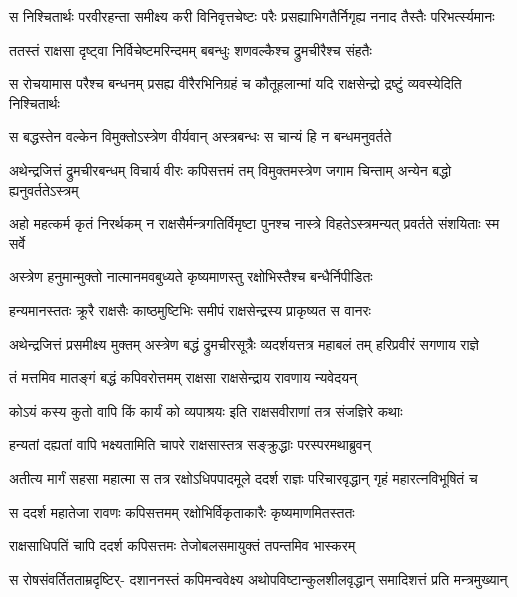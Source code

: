 \fourlineindentedshloka
{स निश्चितार्थः परवीरहन्ता}
{समीक्ष्य करी विनिवृत्तचेष्टः}
{परैः प्रसह्याभिगतैर्निगृह्य}
{ननाद तैस्तैः परिभर्त्स्यमानः} %

\twolineshloka
{ततस्तं राक्षसा दृष्ट्वा निर्विचेष्टमरिन्दमम्}
{बबन्धुः शणवल्कैश्च द्रुमचीरैश्च संहतैः} %

\fourlineindentedshloka
{स रोचयामास परैश्च बन्धनम्}
{प्रसह्य वीरैरभिनिग्रहं च}
{कौतूहलान्मां यदि राक्षसेन्द्रो}
{द्रष्टुं व्यवस्येदिति निश्चितार्थः} %

\twolineshloka
{स बद्धस्तेन वल्केन विमुक्तोऽस्त्रेण वीर्यवान्}
{अस्त्रबन्धः स चान्यं हि न बन्धमनुवर्तते} %

\fourlineindentedshloka
{अथेन्द्रजित्तं द्रुमचीरबन्धम्}
{विचार्य वीरः कपिसत्तमं तम्}
{विमुक्तमस्त्रेण जगाम चिन्ताम्}
{अन्येन बद्धो ह्यनुवर्ततेऽस्त्रम्} %

\fourlineindentedshloka
{अहो महत्कर्म कृतं निरर्थकम्}
{न राक्षसैर्मन्त्रगतिर्विमृष्टा}
{पुनश्च नास्त्रे विहतेऽस्त्रमन्यत्}
{प्रवर्तते संशयिताः स्म सर्वे} %

\twolineshloka
{अस्त्रेण हनुमान्मुक्तो नात्मानमवबुध्यते}
{कृष्यमाणस्तु रक्षोभिस्तैश्च बन्धैर्निपीडितः} %

\twolineshloka
{हन्यमानस्ततः क्रूरै राक्षसैः काष्ठमुष्टिभिः}
{समीपं राक्षसेन्द्रस्य प्राकृष्यत स वानरः} %

\fourlineindentedshloka
{अथेन्द्रजित्तं प्रसमीक्ष्य मुक्तम्}
{अस्त्रेण बद्धं द्रुमचीरसूत्रैः}
{व्यदर्शयत्तत्र महाबलं तम्}
{हरिप्रवीरं सगणाय राज्ञे} %

\twolineshloka
{तं मत्तमिव मातङ्गं बद्धं कपिवरोत्तमम्}
{राक्षसा राक्षसेन्द्राय रावणाय न्यवेदयन्} %

\twolineshloka
{कोऽयं कस्य कुतो वापि किं कार्यं को व्यपाश्रयः}
{इति राक्षसवीराणां तत्र संजज्ञिरे कथाः} %

\twolineshloka
{हन्यतां दह्यतां वापि भक्ष्यतामिति चापरे}
{राक्षसास्तत्र सङ्क्रुद्धाः परस्परमथाब्रुवन्} %

\fourlineindentedshloka
{अतीत्य मार्गं सहसा महात्मा}
{स तत्र रक्षोऽधिपपादमूले}
{ददर्श राज्ञः परिचारवृद्धान्}
{गृहं महारत्नविभूषितं च} %

\twolineshloka
{स ददर्श महातेजा रावणः कपिसत्तमम्}
{रक्षोभिर्विकृताकारैः कृष्यमाणमितस्ततः} %

\twolineshloka
{राक्षसाधिपतिं चापि ददर्श कपिसत्तमः}
{तेजोबलसमायुक्तं तपन्तमिव भास्करम्} %

\fourlineindentedshloka
{स रोषसंवर्तितताम्रदृष्टिर्-}
{दशाननस्तं कपिमन्ववेक्ष्य}
{अथोपविष्टान्कुलशीलवृद्धान्}
{समादिशत्तं प्रति मन्त्रमुख्यान्} %

